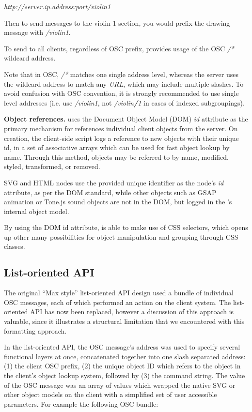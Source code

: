 \textit{http://server.ip.address:port/violin1}

Then to send messages to the violin 1 section, you would prefix the drawing message with \textit{/violin1}.

To send to all clients, regardless of OSC prefix, \drawsocket provides usage of the OSC \textit{/*} wildcard address.

Note that in OSC, \textit{/*} matches one single address level, whereas the \drawsocket server uses the wildcard address to match any \textit{URL}, which may include multiple slashes.
To avoid confusion with OSC convention, it is strongly recommended to use single level addresses (i.e. use \textit{/violin1}, not \textit{/violin\textbf{/}1} in cases of indexed subgroupings).

\medskip
\noindent
\textbf{Object references.} 
\drawsocket uses the Document Object Model (DOM)\cite{Champion:04:DOM} \textit{id} attribute as the primary mechanism for references individual client objects from the server.
On creation, the client-side script logs a reference to new objects with their unique id, in a set of associative arrays which can be used for fast object lookup by name. 
Through this method, objects may be referred to by name, modified, styled, transformed, or removed.

SVG and HTML nodes use the provided unique identifier as the node's \textit{id} attribute, as per the DOM standard, while other objects such as GSAP animation or Tone.js sound objects are not in the DOM, but logged in the \drawsocket's internal object model.

By using the DOM id attribute, \drawsocket is able to make use of CSS selectors, which opens up other many possibilities for object manipulation and grouping through CSS classes.

\subsection{List-oriented API}\label{sec:maxstyle}
The original ``Max style'' list-oriented  \drawsocket API design used a bundle of individual OSC messages, each of which performed an action on the client system. 
The list-oriented API has now been replaced, however a discussion of this approach is valuable, since it illustrates a structural limitation that we encountered with this formatting approach.

In the list-oriented API, the OSC message's address was used to specify several functional layers at once, concatenated together into one slash separated address: (1) the client OSC prefix, (2) the unique object ID which refers to the object in the client's object lookup system, followed by (3) the command string.
The value of the OSC message was an array of values which wrapped the native SVG or other object models on the client with a simplified set of user accessible parameters. For example the following OSC bundle:

